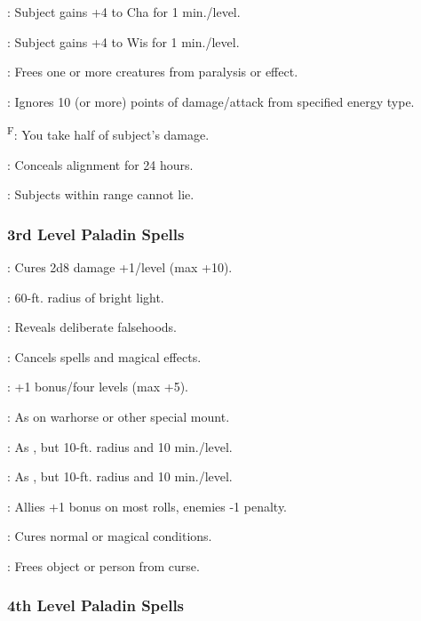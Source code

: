 : Subject gains +4 to Cha for 1 min./level.

: Subject gains +4 to Wis for 1 min./level.

: Frees one or more creatures from paralysis or  effect.

: Ignores 10 (or more) points of damage/attack from specified energy type.

\textsuperscript{F}: You take half of subject's damage.

: Conceals alignment for 24 hours.

: Subjects within range cannot lie.

\subsubsection{3rd Level Paladin Spells}

: Cures 2d8 damage +1/level (max +10).

: 60-ft. radius of bright light.

: Reveals deliberate falsehoods.

: Cancels spells and magical effects.

: +1 bonus/four levels (max +5).

: As  on warhorse or other special mount.

: As , but 10-ft. radius and 10 min./level.

: As , but 10-ft. radius and 10 min./level.

: Allies +1 bonus on most rolls, enemies -1 penalty.

: Cures normal or magical conditions.

: Frees object or person from curse.

\subsubsection{4th Level Paladin Spells}

